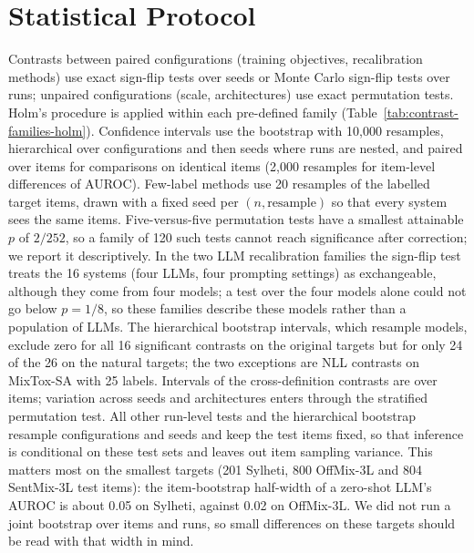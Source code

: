 \section{Statistical Protocol}
\label{sec:appendix-statistics}

Contrasts between paired configurations (training objectives, recalibration methods) use exact sign-flip tests over
seeds or Monte Carlo sign-flip tests over runs; unpaired configurations (scale, architectures) use exact permutation
tests. Holm's procedure is applied within each pre-defined family (Table~\ref{tab:contrast-families-holm}). Confidence
intervals use the bootstrap with 10{,}000 resamples, hierarchical over configurations and then seeds where runs are
nested, and paired over items for comparisons on identical items (2{,}000 resamples for item-level differences of
AUROC). Few-label methods use 20 resamples of the labelled target items, drawn with a fixed seed per $(n,
\text{resample})$ so that every system sees the same items. Five-versus-five permutation tests have a smallest
attainable $p$ of $2/252$, so a family of 120 such tests cannot reach significance after correction; we report it
descriptively. In the two LLM recalibration families the sign-flip test treats the 16 systems (four LLMs, four
prompting settings) as exchangeable, although they come from four models; a test over the four models alone could not
go below $p = 1/8$, so these families describe these models rather than a population of LLMs. The hierarchical
bootstrap intervals, which
resample models, exclude zero for all 16 significant contrasts on the original targets but for only 24 of the 26 on the
natural targets; the two exceptions are NLL contrasts on MixTox-SA with 25 labels. Intervals of the cross-definition
contrasts are over items; variation across seeds and architectures enters through the stratified permutation test.
All other run-level tests and the hierarchical bootstrap resample configurations and seeds and keep the test items
fixed, so that inference is conditional on these test sets and leaves out item sampling variance. This matters most on
the smallest targets (201 Sylheti, 800 OffMix-3L and 804 SentMix-3L test items): the item-bootstrap half-width of a
zero-shot LLM's AUROC is about 0.05 on Sylheti, against 0.02 on OffMix-3L. We did not run a joint bootstrap over items
and runs, so small differences on these targets should be read with that width in mind.

